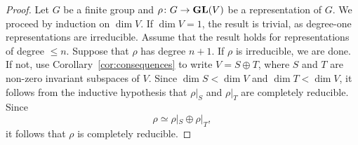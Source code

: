 \begin{proof}
    Let $G$ be a finite group and $\rho\colon G\to\mathbf{GL}(V)$ be a representation of $G$. We proceed
    by induction on $\dim V$.
    If $\dim V=1$, the result is trivial, as degree-one representations are irreducible. Assume that
    the result holds for representations of degree $\leq n$. Suppose that $\rho$ has degree $n+1$. 
    If $\rho$ is irreducible, we are done. If not, use 
    Corollary~\ref{cor:consequences} to 
    write $V=S\oplus T$, where $S$ and $T$
    are non-zero invariant subspaces of $V$. Since $\dim S<\dim V$ and $\dim T<\dim V$, it follows from
    the inductive hypothesis that
    $\rho|_S$ and $\rho|_T$ are completely reducible. Since
    \[
    \rho\simeq\rho|_S\oplus\rho|_T,
    \]
    it follows that $\rho$ is completely reducible.
\end{proof}

